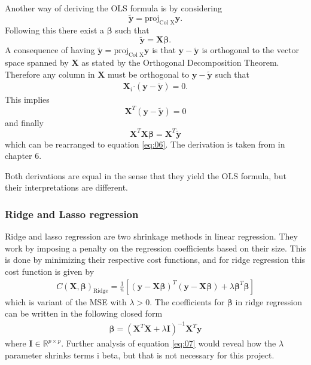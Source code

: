 \documentclass[uio,jmp,amsmath,amssymb,reprint,nofootinbib]{revtex4-1}
\numberwithin{equation}{section}
\newcommand{\lp}{\left(}
\newcommand{\rp}{\right)}
\newcommand{\lsb}{\left[}
\newcommand{\rsb}{\right]}
\newcommand{\pdot}{\boldsymbol{\cdot}}
\begin{document}
Another way of deriving the OLS formula is by considering
\begin{equation}
    \bm{\tilde{y}} = \text{proj}_{\text{Col X}}\bm{y}.
\end{equation}
Following this there exist a \(\bm{\beta}\) such that
\begin{equation}
    \bm{\tilde{y}} = \bm{X}\bm{\beta}.
\end{equation}
A consequence of having \(\bm{\tilde{y}} = \text{proj}_{\text{Col X}}\bm{y}\) is that \(\bm{y} - \bm{\tilde{y}}\) is orthogonal to the vector space spanned by \(\bm{X}\) as stated by the Orthogonal Decomposition Theorem. Therefore any column in \(\bm{X}\) must be orthogonal to \(\bm{y} - \bm{\tilde{y}}\) such that
\begin{align}
    \bm{X}_i\pdot (\bm{y} - \bm{\tilde{y}}) = 0.
\end{align}
This implies
\begin{equation}
    \bm{X}^T(\bm{y} - \bm{\tilde{y}}) = 0
\end{equation}
and finally
\begin{equation}
    \bm{X}^T\bm{X}\bm{\beta} = \bm{X}^T\bm{\tilde{y}} 
\end{equation}
which can be rearranged to equation \ref{eq:06}. The derivation is taken from \citep{LayDavidC2016Laai} in chapter 6.

Both derivations are equal in the sense that they yield the OLS formula, but their interpretations are different.

\subsubsection{Ridge and Lasso regression}

Ridge and lasso regression are two shrinkage methods in linear regression. They work by imposing a penalty on the regression coefficients based on their size. This is done by minimizing their respective cost functions, and for ridge regression this cost function is given by
\begin{align}
    C(\bm{X,\beta})_{\text{Ridge}} = \frac{1}{n}\lsb \lp \bm{y} - \bm{X\beta}\rp^T\lp \bm{y} - \bm{X\beta}\rp + \lambda \bm{\beta}^T\bm{\beta}\rsb
\end{align}
which is variant of the MSE with \(\lambda > 0\). The coefficients for \(\bm{\beta}\) in ridge regression can be written in the following closed form
\begin{align}\label{eq:07}
    \bm{\beta} = (\bm{X}^T\bm{X} + \lambda\bm{I})^{-1}\bm{X}^T\bm{y}
\end{align}
where \(\bm{I} \in \mathbb{R}^{p\times p}\). Further analysis of equation \ref{eq:07} would reveal how the \(\lambda\) parameter shrinks terms i beta, but that is not necessary for this project.
\end{document}
